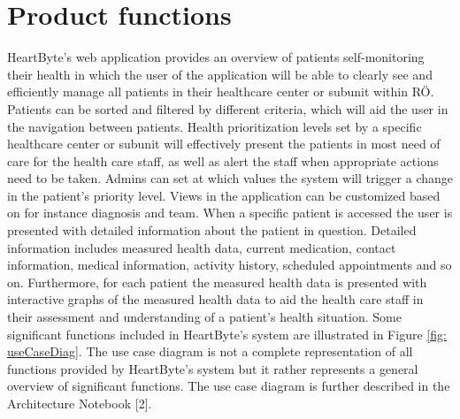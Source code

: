 \documentclass{scrreprt}
\begin{document}
\section{Product functions} 
HeartByte’s web application provides an overview of patients self-monitoring their health in which the user of the application will be able to clearly see and efficiently manage all patients in their healthcare center or subunit within RÖ. Patients can be sorted and filtered by different criteria, which will aid the user in the navigation between patients. Health prioritization levels set by a specific healthcare center or subunit will effectively present the patients in most need of care for the health care staff, as well as alert the staff when appropriate actions need to be taken. Admins can set at which values the system will trigger a change in the patient’s priority level. Views in the application can be customized based on for instance diagnosis and team. When a specific patient is accessed the user is presented with detailed information about the patient in question. Detailed information includes measured health data, current medication, contact information, medical information, activity history, scheduled appointments and so on. Furthermore, for each patient the measured health data is presented with interactive graphs of the measured health data to aid the health care staff in their assessment and understanding of a patient’s health situation. 
\newline
\newline
Some significant functions included in HeartByte’s system are illustrated in Figure \ref{fig: useCaseDiag}. The use case diagram is not a complete representation of all functions provided by HeartByte’s system but it rather represents a general overview of significant functions. The use case diagram is further described in the Architecture Notebook [2].
\end{document}
